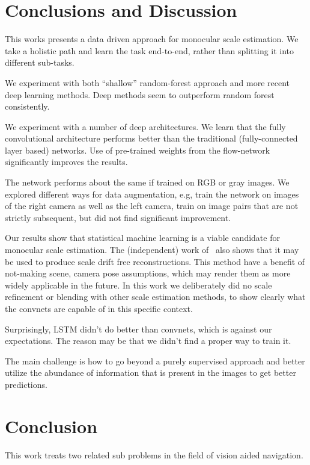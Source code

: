 \section{Conclusions and Discussion}

This works presents a data driven approach for monocular scale
estimation.  We take a holistic path and learn the task end-to-end,
rather than splitting it into different sub-tasks.

We experiment with both ``shallow'' random-forest approach and more
recent deep learning methods.  Deep methods seem to outperform random
forest consistently.

We experiment with a number of deep architectures. We learn that the
fully convolutional architecture performs better than the traditional
(fully-connected layer based) networks.  Use of pre-trained weights
from the flow-network significantly improves the results.

The network performs about the same if trained on RGB or gray images.
We explored different ways for data augmentation, e.g, train the
network on images of the right camera as well as the left camera,
train on image pairs that are not strictly subsequent, but did not
find significant improvement.

Our results show that statistical machine learning is a viable
candidate for monocular scale estimation.  The (independent) work
of~\cite{frost2017using} also shows that it may be used to produce scale
drift free reconstructions.  This method have a benefit of not-making
scene, camera pose assumptions, which may render them as more widely
applicable in the future.  In this work we deliberately did no scale
refinement or blending with other scale estimation methods, to show
clearly what the convnets are capable of in this specific context.

Surprisingly, LSTM didn't do better than convnets, which is against
our expectations. The reason may be that we didn't find a proper way
to train it.

The main challenge is how to go beyond a purely supervised approach
and better utilize the abundance of information that is present in the
images to get better predictions.

\section{Conclusion}

This work treats two related sub problems in the field of vision aided
navigation.

